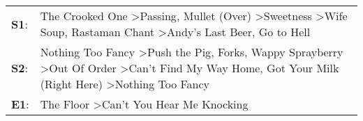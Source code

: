 \begin{supertabular}{p{0.03\textwidth}p{0.92\textwidth}}
 \textbf{S1}:  &                                    The Crooked One\textsuperscript{} \textgreater \enspace Passing\textsuperscript{}, \enspace Mullet (Over)\textsuperscript{} \textgreater \enspace Sweetness\textsuperscript{} \textgreater \enspace Wife Soup\textsuperscript{}, \enspace Rastaman Chant\textsuperscript{} \textgreater \enspace Andy's Last Beer\textsuperscript{}, \enspace Go to Hell\textsuperscript{}  \enspace  \\
 \textbf{S2}:  &  Nothing Too Fancy\textsuperscript{} \textgreater \enspace Push the Pig\textsuperscript{}, \enspace Forks\textsuperscript{}, \enspace Wappy Sprayberry\textsuperscript{} \textgreater \enspace Out Of Order\textsuperscript{} \textgreater \enspace Can't Find My Way Home\textsuperscript{}, \enspace Got Your Milk (Right Here)\textsuperscript{} \textgreater \enspace Nothing Too Fancy\textsuperscript{}  \enspace  \\
 \textbf{E1}:  &                                                                                                                                                                                                                                                                                                                The Floor\textsuperscript{} \textgreater \enspace Can't You Hear Me Knocking\textsuperscript{}  \enspace  \\
\end{supertabular}
